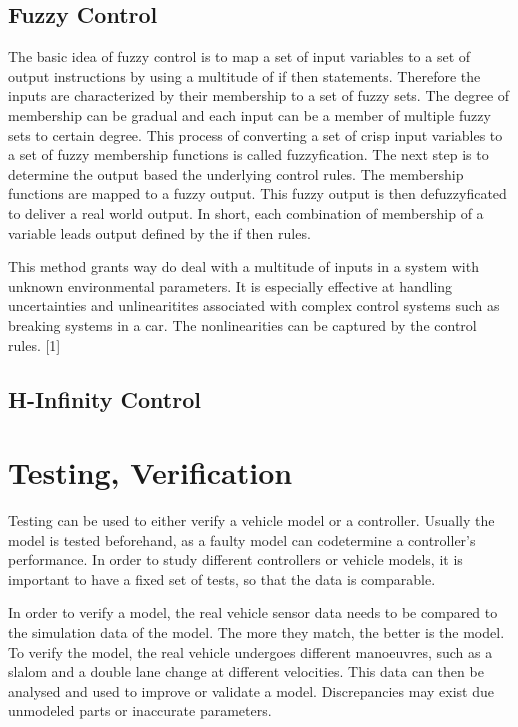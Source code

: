 \documentclass[conference]{IEEEtran}
\begin{document}
\subsection{Fuzzy Control}
The basic idea of fuzzy control is to map a set of input variables to a set of output instructions by using a multitude of if then statements. Therefore the inputs are characterized by their membership to a set of fuzzy sets. The degree of membership can be gradual and each input can be a member of multiple fuzzy sets to certain degree. This process of converting a set of crisp input variables to a set of fuzzy membership functions is called fuzzyfication. The next step is to determine the output based the underlying control rules. The membership functions are mapped to a fuzzy output. This fuzzy output is then defuzzyficated to deliver a real world output. In short, each combination of membership of a variable leads output defined by the if then rules.

This method grants way do deal with a multitude of inputs in a system with unknown environmental parameters. It is especially effective at handling uncertainties and unlinearitites associated with complex control systems such as breaking systems in a car. The nonlinearities can be captured by the control rules.
[1]
\subsection{H-Infinity Control}

\section{Testing, Verification}

Testing can be used to either verify a vehicle model or a controller. Usually the model is tested beforehand, as a faulty model can codetermine a controller's performance. 
In order to study different controllers or vehicle models, it is important to have a fixed set of tests, so that the data is comparable.

In order to verify a model, the real vehicle sensor data needs to be compared to the simulation data of the model. The more they match, the better is the model. To verify the model, the real vehicle undergoes different manoeuvres, such as a slalom and a double lane change at different velocities. This data can then be analysed and used to improve or validate a model. Discrepancies may exist due unmodeled parts or inaccurate parameters.
\end{document}
